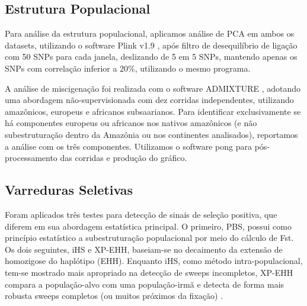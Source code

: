 \subsection{Estrutura Populacional}

Para análise da estrutura populacional, aplicamos análise de PCA em ambos os datasets, utilizando o software Plink v1.9 \cite{chang_second-generation_2015}, após filtro de desequilíbrio de ligação com 50 SNPs para cada janela, deslizando de 5 em 5 SNPs, mantendo apenas os SNPs com correlação inferior a 20\%, utilizando o mesmo programa.

A análise de miscigenação foi realizada com o software ADMIXTURE \cite{alexander_fast_2009}, adotando uma abordagem não-supervisionada com dez corridas independentes, utilizando amazônicos, europeus e africanos subsaarianos. Para identificar exclusivamente se há componentes europeus ou africanos nos nativos amazônicos (e não subestruturação dentro da Amazônia ou nos continentes analisados), reportamos a análise com os três componentes. Utilizamos o software pong \cite{behr_pong_2016} para pós-processamento das corridas e produção do gráfico. 

\subsection{Varreduras Seletivas}
\label{subsec:amazonia_methods_ehh}

Foram aplicados três testes para detecção de sinais de seleção positiva, que diferem em sua abordagem estatística principal. O primeiro, PBS, possui como princípio estatístico a subestruturação populacional por meio do cálculo de Fst. Os dois seguintes, iHS e XP-EHH, baseiam-se no decaimento da extensão de homozigose do haplótipo (EHH). Enquanto iHS, como método intra-populacional, tem-se mostrado mais apropriado na detecção de sweeps incompletos, XP-EHH compara a população-alvo com uma população-irmã e detecta de forma mais robusta sweeps completos (ou muitos próximos da fixação) \cite{suzuki_statistical_2010}. 

